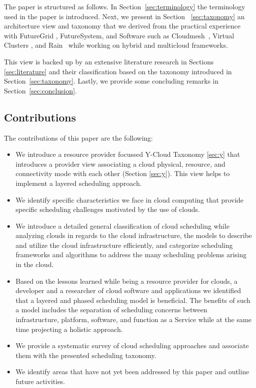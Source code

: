 \documentclass[final,5p,times,twocolumn]{elsarticle}
\begin{document}
The paper is structured as follows.  In Section~\ref{sec:terminology} the
terminology used in the paper is introduced. Next, we present in
Section ~\ref{sec:taxonomy} an architecture view and taxonomy that we
derived from the practical experience with FutureGrid
\cite{las12fg-bookchapter,fox2013futuregrid}, FutureSystem, and Software such as
Cloudmesh~\cite{von2014accessing}, Virtual Clusters \cite{las-comet}, and
Rain~\cite{las-fg-1295,las10dynamic,las-rain} while working on
hybrid and multicloud frameworks.

This view is backed up by an extensive literature research in Sections
\ref{sec:literature} and their classification based on the taxonomy
introduced in Section~\ref{sec:taxonomy}. Lastly, we provide some
concluding remarks in Section~\ref{sec:conclusion}.

\subsection{Contributions}

The contributions of this paper are the following:

\begin{itemize}

\item We introduce a resource provider focussed Y-Cloud Taxonomy
  \ref{sec:y} that introduces a provider view associating a cloud
  physical, resource, and connectivity mode with each other (Section
  \ref{sec:y}). This view helps to implement a layered scheduling
  approach.

\item We identify specific characteristics we face in cloud computing
  that provide specific scheduling challenges motivated by the use of clouds.

\item We introduce a detailed general classification of cloud
  scheduling while analyzing clouds in regards to the cloud 
  infrastructure, the models to describe and utilize the cloud infrastructure
  efficiently, and categorize scheduling frameworks and algorithms to
  address the many scheduling problems arising in the cloud.

\item Based on the lessons learned while being a resource provider for
  clouds, a developer and a researcher of cloud software and
  applications we identified that a layered and phased scheduling
  model is beneficial. The benefits of such a model includes the
  separation of scheduling concerns between infrastructure, platform, software,
  and function as a Service while at the same time projecting a
  holistic approach.

\item We provide a systematic survey of cloud scheduling approaches
  and associate them with the presented scheduling taxonomy.

\item We identify areas that have not yet been addressed by this paper
  and outline future activities.

\end{itemize}
\end{document}
